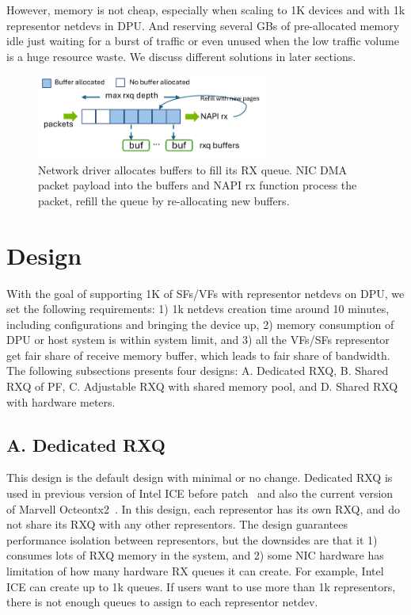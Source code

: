 \documentclass[letterpaper]{article}
\begin{document}
However, memory is not cheap, especially when scaling to 1K devices
and with 1k representor netdevs in DPU. And reserving several GBs of
pre-allocated memory idle just waiting for a burst of traffic
or even unused when the low traffic volume is a huge resource waste.
We discuss different solutions in later sections.

\begin{figure}[t!]
\includegraphics[width=3.0in]{rxq.pdf}
\centering
\caption{Network driver allocates buffers to fill its RX queue. NIC DMA packet
payload into the buffers and NAPI rx function process the packet, refill the 
queue by re-allocating new buffers.}
\label{fig:rxq}
\end{figure}

\section{Design}
With the goal of supporting 1K of SFs/VFs with representor netdevs
on DPU, we set the following requirements: 1) 1k netdevs creation time
around 10 minutes, including configurations and bringing the device up,
2) memory consumption of DPU or host system is within
system limit, and 3) all the VFs/SFs representor get fair share
of receive memory buffer, which leads to fair share of bandwidth.
The following subsections presents four designs: A. Dedicated RXQ,
B. Shared RXQ of PF, C. Adjustable RXQ with shared memory pool, and
D. Shared RXQ with hardware meters.

\subsection{A. Dedicated RXQ}
This design is the default design with minimal or no change.
Dedicated RXQ is used in previous version of Intel ICE before patch~\cite{icepatch}
and also the current version of Marvell Octeontx2~\cite{octeontx2}.
In this design, each representor has its own RXQ, and do not share its
RXQ with any other representors. The design guarantees performance isolation
between representors, but the downsides are that it 1) consumes
lots of RXQ memory in the system, and 2) some NIC hardware has limitation of
how many hardware RX queues it can create. For example, Intel ICE can create up to
1k queues. If users want to use more than 1k representors, there is not
enough queues to assign to each representor netdev.
\end{document}
